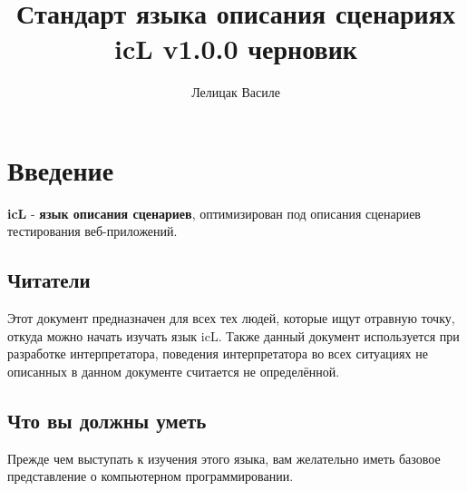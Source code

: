 \documentclass[a4paper, 14pt, russian]{extarticle}
\begin{document}
\newcommand{\stableuni}[6]{
	\begin{longtable}[h]{#1}
	\caption*{Таблица \thetable{}: #4} \label{#3} \\

	\hline
	#2
	\hline
	\endfirsthead

	\multicolumn{3}{l}%
	{{Продолжение таблицы \thetable{}: #4}} \\
	\hline
	#2
	\hline
	\endhead

	\hline
	\endfoot

	\hline
	\endlastfoot
#5
	\end{longtable}
}


\title{Стандарт языка описания сценариях icL v1.0.0 черновик}
\author{Лелицак Василе}

\maketitle

\newpage
\renewcommand{\contentsname}{\textsf{Оглавление}}
\tableofcontents
	
\newpage

\section{Введение}	
	
\indent \textbf{icL} - \textbf{язык описания сценариев}, оптимизирован под описания сценариев тестирования веб-приложений.
	
\subsection{Читатели}
	
	Этот документ предназначен для всех тех людей, которые ищут отравную точку, откуда можно начать изучать язык icL. Также данный документ используется при разработке интерпретатора, поведения интерпретатора во всех ситуациях не описанных в данном документе считается не определённой.
	
\subsection{Что вы должны уметь}
	
Прежде чем выступать к изучения этого языка, вам желательно иметь базовое представление о компьютерном программировании.
	
\end{document}

